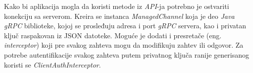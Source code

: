 \documentclass[android.tex]{subfiles}
\begin{document}
Kako bi aplikacija mogla da koristi metode iz \textit{API}-ja potrebno je ostvariti konekciju sa serverom. Kreira se instanca \textit{ManagedChannel} koja je deo \textit{Java gRPC} biblioteke, kojoj se prosleđuju adresa i port \textit{gRPC} servera, kao i privatan ključ raspakovan iz JSON datoteke. Moguće je dodati i presretače (eng. \textit{interceptor}) koji pre svakog zahteva mogu da modifikuju zahtev ili odgovor. Za potrebe autentifikacije svakog zahteva putem privatnog ključa ranije generisanog koristi se \textit{ClientAuthInterceptor}.
\end{document}
